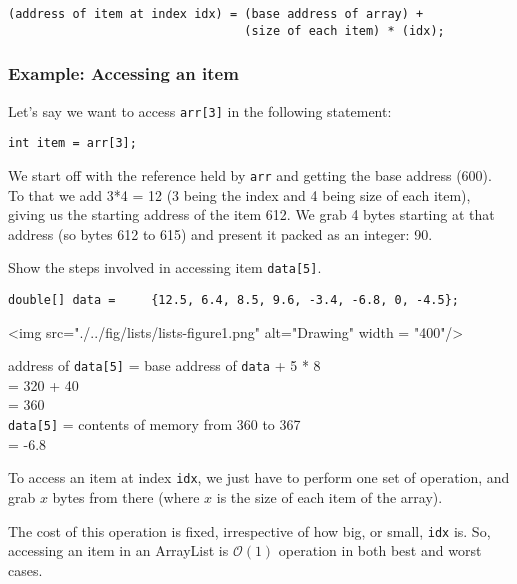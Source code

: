 \begin{verbatim}
(address of item at index idx) = (base address of array) + 
                                 (size of each item) * (idx);
\end{verbatim}

\subsubsection{Example: Accessing an item}

Let's say we want to access \texttt{arr[3]} in the following statement:

\begin{lstlisting}
int item = arr[3];
\end{lstlisting}

We start off with the reference held by \texttt{arr} and getting the base address (600). To that we add 3*4 = 12 (3 being the index and 4 being size of each item), giving us the starting address of the item 612. We grab 4 bytes starting at that address (so bytes 612 to 615) and present it packed as an integer: 90.

\begin{exercise}
Show the steps involved in accessing item \texttt{data[5]}.

\vskip 0.5cm
\begin{lstlisting}
double[] data = 	{12.5, 6.4, 8.5, 9.6, -3.4, -6.8, 0, -4.5};
\end{lstlisting}

<img src="./../fig/lists/lists-figure1.png" alt="Drawing" width = "400"/>
\newline
\end{exercise}
\begin{answer}
address of \texttt{data[5]} = base address of \texttt{data} + 5 * 8\\
= 320 + 40 \\
= 360\\

\texttt{data[5]} = contents of memory from 360 to 367 \\
= -6.8	
\end{answer}

To access an item at index \texttt{idx}, we just have to perform one set of operation, and grab $x$ bytes from there (where $x$ is the size of each item of the array). 

The cost of this operation is fixed, irrespective of how big, or small, \texttt{idx} is. So, accessing an item in an ArrayList is $\mathcal{O}(1)$ operation in both best and worst cases.

